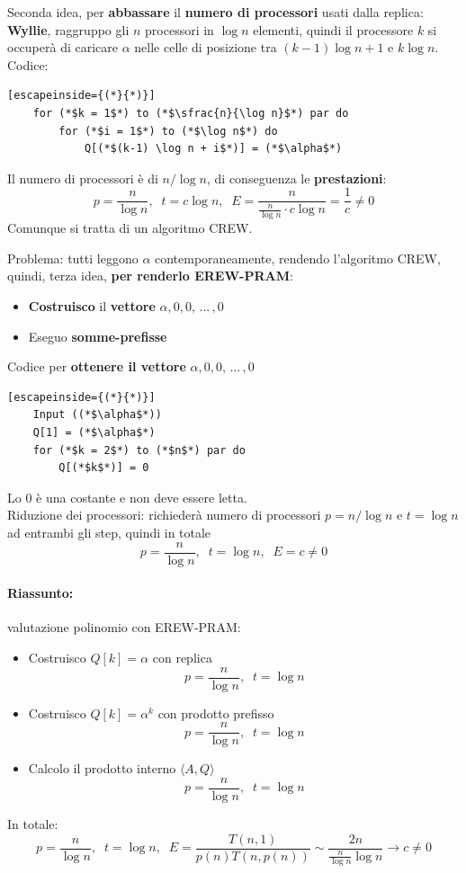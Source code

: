 \documentclass[11pt]{article}
\begin{document}
	\nn
	
	Seconda idea, per \textbf{abbassare} il \textbf{numero di processori} usati dalla replica: \textbf{Wyllie}, raggruppo gli $n$ processori in $\log n$ elementi, quindi il processore $k$ si occuperà di caricare $\alpha$ nelle celle di posizione tra $(k-1) \log n + 1$ e $k \log n$.\\
	
	Codice: 
	\begin{lstlisting}[escapeinside={(*}{*)}]
	for (*$k = 1$*) to (*$\sfrac{n}{\log n}$*) par do 
		for (*$i = 1$*) to (*$\log n$*) do
			Q[(*$(k-1) \log n + i$*)] = (*$\alpha$*)
	\end{lstlisting}
	Il numero di processori è di $n/\log n$, di conseguenza le \textbf{prestazioni}: 
	$$ p = \frac{n}{\log n}, \;\; t = c \log n, \;\; E = \frac{n}{\frac{n}{\log n} \cdot c \log n}  = \frac{1}{c} \neq 0 $$
	Comunque si tratta di un algoritmo CREW.\\
	
	\newpage
	
	Problema: tutti leggono $\alpha$ contemporaneamente, rendendo l'algoritmo CREW, quindi, terza idea, \textbf{per renderlo EREW-PRAM}: 
	\begin{itemize}
		\item \textbf{Costruisco} il \textbf{vettore} $\alpha, 0, 0, \, ... \, , 0$
		\item Eseguo \textbf{somme-prefisse}
	\end{itemize}
	
	Codice per \textbf{ottenere il vettore} $\alpha, 0, 0, \, ... \, , 0$
	\begin{lstlisting}[escapeinside={(*}{*)}]
	Input ((*$\alpha$*))
	Q[1] = (*$\alpha$*)
	for (*$k = 2$*) to (*$n$*) par do
		Q[(*$k$*)] = 0 
	\end{lstlisting}
	Lo 0 è una costante e non deve essere letta.\\
	
	Riduzione dei processori: richiederà numero di processori $p = n/\log n$ e $t = \log n$ ad entrambi gli step, quindi in totale
	$$ p = \frac{n}{\log n}, \;\; t = \log n, \;\; E = c \neq 0 $$
	
	\paragraph{Riassunto:} valutazione polinomio con EREW-PRAM:
	\begin{itemize}
		\item Costruisco $Q[k] = \alpha$ con replica
		$$ p = \frac{n}{\log n}, \;\; t = \log n $$
		
		\item Costruisco $Q[k] = \alpha^k$ con prodotto prefisso
		$$ p = \frac{n}{\log n}, \;\; t = \log n $$
		
		\item Calcolo il prodotto interno $\langle A, Q \rangle$
		$$ p = \frac{n}{\log n}, \;\; t = \log n $$
	\end{itemize}
	In totale:
	$$ p = \frac{n}{\log n}, \;\; t = \log n, \;\; E = \frac{T(n,1)}{p(n) T(n, p(n))} \sim \frac{2n}{\frac{n}{\log n} \log n} \rightarrow c \neq 0 $$
	
\end{document}
